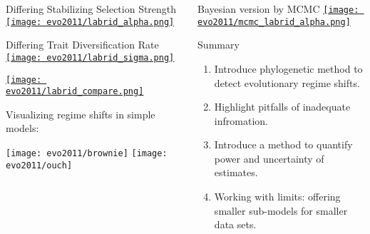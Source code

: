 \documentclass[final,hyperref={pdfpagelabels=false},xcolor=svgnames]{beamer}
\begin{document}
\begin{frame}[t]
\begin{columns}[t]
\begin{column}{.2\paperwidth} %

  \begin{center}
    Differing Stabilizing Selection Strength
    \href{http://www.flickr.com/photos/cboettig/5841932378}{
    \texttt{[image: evo2011/labrid\_alpha.png]}}

    Differing Trait Diversification Rate
    \href{http://www.flickr.com/photos/cboettig/5841932492}{
    \texttt{[image: evo2011/labrid\_sigma.png]}}
  \end{center}

  \begin{center}
    \href{http://www.flickr.com/photos/cboettig/5841932260}{
    \texttt{[image: evo2011/labrid\_compare.png]}}
  \end{center}

\vspace{2in}

{\Large Visualizing regime shifts in simple models:}

 \texttt{[image: evo2011/brownie]}\hspace{1cm} 
\texttt{[image: evo2011/ouch]}

\end{column}



\begin{column}{.28\paperwidth} %
  \vspace{9in}
  \begin{center}
    {\LARGE Bayesian version by MCMC}
    \href{http://www.flickr.com/photos/cboettig/5844577056}{
  \texttt{[image: evo2011/mcmc\_labrid\_alpha.png]}}
  \end{center}



  {\LARGE Summary}
  \begin{enumerate}
    \item Introduce phylogenetic method to detect evolutionary regime shifts.
    \item Highlight pitfalls of inadequate infromation.
    \item Introduce a method to quantify power and uncertainty of estimates.
    \item Working with limits: offering smaller sub-models for smaller data sets.
  \end{enumerate}
		

\end{column}
\end{columns}
\end{frame}
\end{document}
